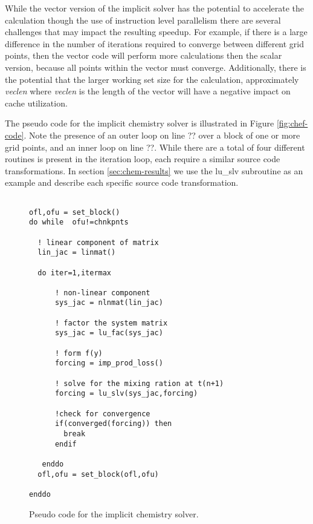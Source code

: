   While the vector version of the implicit solver has the potential to accelerate the calculation though the use of instruction level parallelism there are several challenges that may impact the resulting speedup.  For example, if there is a large difference in the number of iterations required to converge between different grid points, then the vector code will perform more calculations then the scalar version, because all points within the vector must converge. Additionally, there is the potential that the larger working set size for the calculation, approximately {\it veclen} where {\it veclen} is the length of the vector will have a negative impact on cache utilization.  
  
    The pseudo code for the implicit chemistry solver is illustrated in Figure \ref{fig:chef-code}.  Note the presence of an outer loop on line ?? over a block of one or more grid points, and an inner loop on line ??.  While there are a total of four different routines is present in the iteration loop, each require a similar source code transformations.  In section \ref{sec:chem-results} we use the lu\_slv subroutine as an example and describe each specific source code transformation. 

\begin{figure}
\begin{center}
\begin{verbatim}

ofl,ofu = set_block()
do while  ofu!=chnkpnts

  ! linear component of matrix
  lin_jac = linmat()

  do iter=1,itermax

      ! non-linear component 
      sys_jac = nlnmat(lin_jac)

      ! factor the system matrix 
      sys_jac = lu_fac(sys_jac)   

      ! form f(y)
      forcing = imp_prod_loss()

      ! solve for the mixing ration at t(n+1)
      forcing = lu_slv(sys_jac,forcing)  
     
      !check for convergence
      if(converged(forcing)) then 
        break
      endif

   enddo
  ofl,ofu = set_block(ofl,ofu)

enddo

\end{verbatim}
\end{center}
\caption{Pseudo code for the implicit chemistry solver. \label{fig:chem-code}}
\end{figure}


